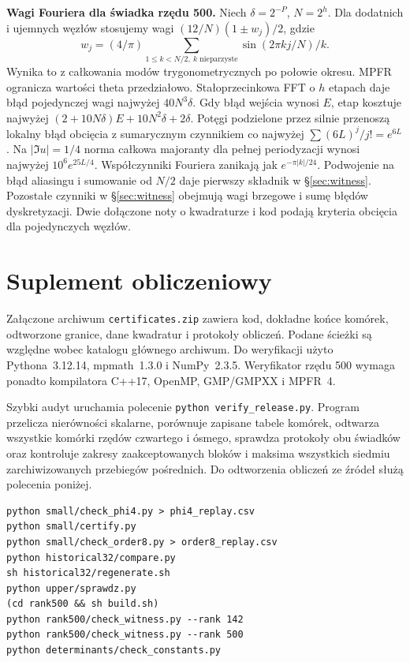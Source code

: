 \documentclass[11pt,a4paper,reqno]{amsart}
\numberwithin{equation}{section}
\begin{document}
\textbf{Wagi Fouriera dla świadka rzędu 500.} Niech \(\delta=2^{-P}\), \(N=2^h\). Dla dodatnich i ujemnych węzłów stosujemy wagi \((12/N)(1\pm w_j)/2\), gdzie \[w_j=(4/\pi)\sum_{1\le k<N/2,\ k\text{ nieparzyste}}\sin(2\pi kj/N)/k.\] Wynika to z całkowania modów trygonometrycznych po połowie okresu. MPFR ogranicza wartości theta przedziałowo. Stałoprzecinkowa FFT o \(h\) etapach daje błąd pojedynczej wagi najwyżej \(40N^3\delta\). Gdy błąd wejścia wynosi \(E\), etap kosztuje najwyżej \((2+10N\delta)E+10N^2\delta+2\delta\). Potęgi podzielone przez silnie przenoszą lokalny błąd obcięcia z sumarycznym czynnikiem co najwyżej \(\sum(6L)^j/j!=e^{6L}\). Na \(\lvert\Im u\rvert=1/4\) norma całkowa majoranty dla pełnej periodyzacji wynosi najwyżej \(10^6e^{25L/4}\). Współczynniki Fouriera zanikają jak \(e^{-\pi|k|/24}\). Podwojenie na błąd aliasingu i sumowanie od \(N/2\) daje pierwszy składnik w \S\ref{sec:witness}. Pozostałe czynniki w \S\ref{sec:witness} obejmują wagi brzegowe i sumę błędów dyskretyzacji. Dwie dołączone noty o kwadraturze i kod podają kryteria obcięcia dla pojedynczych węzłów.

\section{Suplement obliczeniowy}\label{sec:replay}


Załączone archiwum \texttt{certificates.zip} zawiera kod, dokładne końce komórek, odtworzone granice, dane kwadratur i protokoły obliczeń. Podane ścieżki są względne wobec katalogu głównego archiwum. Do weryfikacji użyto Pythona~3.12.14, mpmath~1.3.0 i NumPy~2.3.5. Weryfikator rzędu 500 wymaga ponadto kompilatora C++17, OpenMP, GMP/GMPXX i MPFR~4.

Szybki audyt uruchamia polecenie \texttt{python verify\_release.py}. Program przelicza nierówności skalarne, porównuje zapisane tabele komórek, odtwarza wszystkie komórki rzędów czwartego i ósmego, sprawdza protokoły obu świadków oraz kontroluje zakresy zaakceptowanych bloków i maksima wszystkich siedmiu zarchiwizowanych przebiegów pośrednich. Do odtworzenia obliczeń ze źródeł służą polecenia poniżej.

\begin{verbatim}
python small/check_phi4.py > phi4_replay.csv
python small/certify.py
python small/check_order8.py > order8_replay.csv
python historical32/compare.py
sh historical32/regenerate.sh
python upper/sprawdz.py
(cd rank500 && sh build.sh)
python rank500/check_witness.py --rank 142
python rank500/check_witness.py --rank 500
python determinants/check_constants.py
\end{verbatim}
\end{document}
